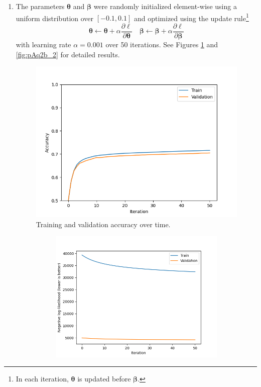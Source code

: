 \documentclass[10pt]{article}
\begin{document}
\begin{enumerate}
\begin{enumerate}[label = \textbf{\alph*}.]
        \item The parameters $\bm \theta$ and $\bm \beta$ were randomly initialized element-wise using a uniform distribution over $[-0.1, 0.1]$ and optimized using the update rule\footnote{In each iteration, $\bm\theta$ is updated before $\bm\beta$.}
        $$
            \bm\theta \gets \bm\theta + \alpha\frac{\partial \ell}{\partial \bm\theta}\quad \bm\beta \gets \bm\beta + \alpha\frac{\partial \ell}{\partial \bm\beta}
        $$
        with learning rate $\alpha=0.001$ over 50 iterations.
        See Figures \ref{fig:pAq2b_1} and \ref{fig:pAq2b_2} for detailed results.
        \begin{figure}[h!]
            \centering
            \includegraphics[width=.85\textwidth]{final/acc.png}
            \caption{Training and validation accuracy over time.}
            \label{fig:pAq2b_1}
        \end{figure}
        \begin{figure}[h!]
            \centering
            \begin{subfigure}[h!]{.46\textwidth}
                \centering
                \includegraphics[width=.95\linewidth]{final/nll.png}

\end{subfigure}
\end{figure}
\end{enumerate}
\end{enumerate}
\end{document}
